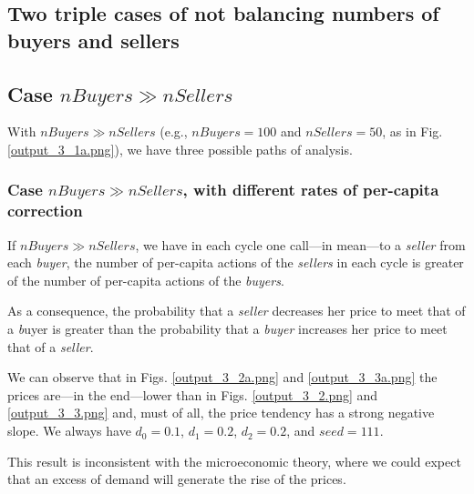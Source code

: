\documentclass[10pt]{report}
\begin{document}
\begin{appendices}

\chapter{Two triple cases of not balancing numbers of buyers and sellers}\label{Two triple cases of not balancing numbers of buyers and sellers}
\thispagestyle{fancy}

\section{Case $nBuyers \gg nSellers$}
With $nBuyers \gg nSellers$ (e.g., $nBuyers=100$ and $nSellers=50$, as in Fig. \ref{output_3_1a.png}), we have three possible paths of analysis. 

\subsection{Case $nBuyers \gg nSellers$, with different rates of per-capita correction}\label{nBuyers > nSellers with different rates of per-capita correction}

If $nBuyers \gg nSellers$, we have in each cycle one call---in mean---to a  \emph{seller} from each  \emph{buyer}, the number of per-capita actions of the \emph{sellers} in each cycle is greater of the number of per-capita actions of the \emph{buyers}.

As a consequence, the probability that a \emph{seller} decreases her price to meet that of a \emph{b}uyer is greater than the probability that a \emph{buyer} increases her price to meet that of a \emph{seller}. 

We can observe that in Figs. \ref{output_3_2a.png} and \ref{output_3_3a.png} the prices are---in the end---lower than in Figs. \ref{output_3_2.png} and \ref{output_3_3.png} and, must of all, the price tendency has a strong negative slope. We always have $d_0=0.1$, $d_1=0.2$,  $d_2=0.2$, and $seed=111$.

This result is inconsistent with the microeconomic theory, where we could expect that an excess of demand will generate the rise of the prices.


\end{appendices}
\end{document}
